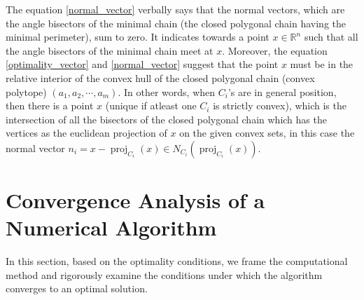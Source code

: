 \documentclass[12pt]{article}
\theoremstyle{plain}
\theoremstyle{definition}
\begin{document}
The equation \eqref{normal_vector} verbally says that the normal vectors, which are the angle bisectors of the minimal chain (the closed polygonal chain having the minimal perimeter), sum to zero. It indicates towards a point $x \in \mathbb{R}^n$ such that all the angle bisectors of the minimal chain meet at $x$. Moreover, the equation \eqref{optimality_vector}  and \eqref{normal_vector} suggest that the point $x$ must be in the relative interior of the convex hull of the closed polygonal chain (convex polytope) $(a_1, a_2, \cdots, a_m)$.
In other words, when $C_i$'s are in general position, then there is a point $x$ (unique if atleast one $C_i$ is strictly convex), which is the intersection of all the bisectors of the closed polygonal chain which has the vertices as the euclidean projection of $x$ on the given convex sets, in this case the normal vector  $n_i= x-\operatorname{proj}_{C_i}(x) \in N_{C_i}(\operatorname{proj}_{C_i}(x))$.


	
\section{Convergence Analysis of a Numerical Algorithm}\label{Convergence}
In this section, based on the optimality conditions, we frame the computational method and rigorously examine the conditions under which the algorithm converges to an optimal solution.
\end{document}
